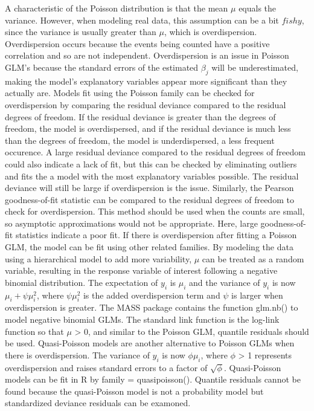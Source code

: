 \documentclass[
]{book}
\begin{document}
A characteristic of the Poisson distribution is that the mean \(\mu\) equals the variance. However, when modeling real data, this assumption can be a bit \({fishy}\), since the variance is usually greater than \(\mu\), which is overdispersion. Overdispersion occurs because the events being counted have a positive correlation and so are not independent. Overdispersion is an issue in Poisson GLM's because the standard errors of the estimated \(\beta_j\) will be underestimated, making the model's explanatory variables appear more significant than they actually are. Models fit using the Poisson family can be checked for overdispersion by comparing the residual deviance compared to the residual degrees of freedom. If the residual deviance is greater than the degrees of freedom, the model is overdispersed, and if the residual deviance is much less than the degrees of freedom, the model is underdispersed, a less frequent occurence. A large residual deviance compared to the residual degrees of freedom could also indicate a lack of fit, but this can be checked by eliminating outliers and fits the a model with the most explanatory variables possible. The residual deviance will still be large if overdispersion is the issue. Similarly, the Pearson goodness-of-fit statistic can be compared to the residual degrees of freedom to check for overdispersion. This method should be used when the counts are small, so asymptotic approximations would not be appropriate. Here, large goodness-of-fit statistics indicate a poor fit. If there is overdispersion after fitting a Poisson GLM, the model can be fit using other related families. By modeling the data using a hierarchical model to add more variability, \(\mu\) can be treated as a random variable, resulting in the response variable of interest following a negative binomial distribution. The expectation of \(y_i\) is \(\mu_i\) and the variance of \(y_i\) is now \(\mu_i + \psi\mu_i^2\), where \(\psi\mu_i^2\) is the added overdispersion term and \(\psi\) is larger when overdispersion is greater. The MASS package contains the function glm.nb() to model negative binomial GLMs. The standard link function is the log-link function so that \(\mu\) \textgreater{} 0, and similar to the Poisson GLM, quantile residuals should be used. Quasi-Poisson models are another alternative to Poisson GLMs when there is overdispersion. The variance of \(y_i\) is now \(\phi\mu_i\), where \(\phi\) \textgreater{} 1 represents overdispersion and raises standard errors to a factor of \(\sqrt{\phi}\). Quasi-Poisson models can be fit in R by family = quasipoisson(). Quantile residuals cannot be found because the quasi-Poisson model is not a probability model but standardized deviance residuals can be examoned.

  
\end{document}

